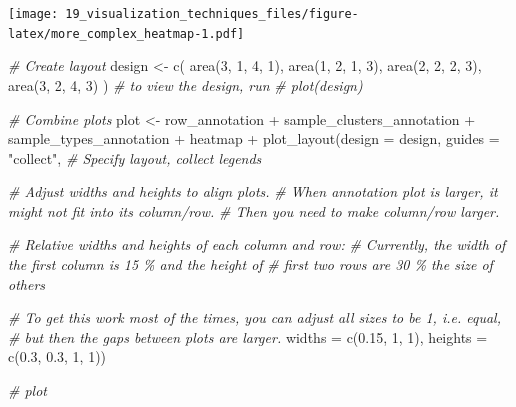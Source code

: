 \documentclass[
]{book}
\newenvironment{Shaded}{\begin{snugshade}}{\end{snugshade}}
\newcommand{\AttributeTok}[1]{\textcolor[rgb]{0.77,0.63,0.00}{#1}}
\newcommand{\CommentTok}[1]{\textcolor[rgb]{0.56,0.35,0.01}{\textit{#1}}}
\newcommand{\DecValTok}[1]{\textcolor[rgb]{0.00,0.00,0.81}{#1}}
\newcommand{\FloatTok}[1]{\textcolor[rgb]{0.00,0.00,0.81}{#1}}
\newcommand{\FunctionTok}[1]{\textcolor[rgb]{0.00,0.00,0.00}{#1}}
\newcommand{\NormalTok}[1]{#1}
\newcommand{\OtherTok}[1]{\textcolor[rgb]{0.56,0.35,0.01}{#1}}
\newcommand{\SpecialCharTok}[1]{\textcolor[rgb]{0.00,0.00,0.00}{#1}}
\newcommand{\StringTok}[1]{\textcolor[rgb]{0.31,0.60,0.02}{#1}}
\begin{document}
\texttt{[image: 19\_visualization\_techniques\_files/figure-latex/more\_complex\_heatmap-1.pdf]}

\begin{Shaded}
\begin{Highlighting}[]
\CommentTok{\# Create layout}
\NormalTok{design }\OtherTok{\textless{}{-}} \FunctionTok{c}\NormalTok{(}
  \FunctionTok{area}\NormalTok{(}\DecValTok{3}\NormalTok{, }\DecValTok{1}\NormalTok{, }\DecValTok{4}\NormalTok{, }\DecValTok{1}\NormalTok{),}
  \FunctionTok{area}\NormalTok{(}\DecValTok{1}\NormalTok{, }\DecValTok{2}\NormalTok{, }\DecValTok{1}\NormalTok{, }\DecValTok{3}\NormalTok{),}
  \FunctionTok{area}\NormalTok{(}\DecValTok{2}\NormalTok{, }\DecValTok{2}\NormalTok{, }\DecValTok{2}\NormalTok{, }\DecValTok{3}\NormalTok{),}
  \FunctionTok{area}\NormalTok{(}\DecValTok{3}\NormalTok{, }\DecValTok{2}\NormalTok{, }\DecValTok{4}\NormalTok{, }\DecValTok{3}\NormalTok{)}
\NormalTok{)}
\CommentTok{\# to view the design, run}
\CommentTok{\# plot(design)}

\CommentTok{\# Combine plots}
\NormalTok{plot }\OtherTok{\textless{}{-}}\NormalTok{ row\_annotation }\SpecialCharTok{+}\NormalTok{ sample\_clusters\_annotation }\SpecialCharTok{+}\NormalTok{ sample\_types\_annotation }\SpecialCharTok{+}\NormalTok{ heatmap  }\SpecialCharTok{+}
    \FunctionTok{plot\_layout}\NormalTok{(}\AttributeTok{design =}\NormalTok{ design, }\AttributeTok{guides =} \StringTok{"collect"}\NormalTok{, }\CommentTok{\# Specify layout, collect legends}
                
                \CommentTok{\# Adjust widths and heights to align plots.}
                \CommentTok{\# When annotation plot is larger, it might not fit into its column/row.}
                \CommentTok{\# Then you need to make column/row larger.}
                
                \CommentTok{\# Relative widths and heights of each column and row:}
                \CommentTok{\# Currently, the width of the first column is 15 \% and the height of}
                \CommentTok{\# first two rows are 30 \% the size of others}
                
                \CommentTok{\# To get this work most of the times, you can adjust all sizes to be 1, i.e. equal, }
                \CommentTok{\# but then the gaps between plots are larger.}
                \AttributeTok{widths =} \FunctionTok{c}\NormalTok{(}\FloatTok{0.15}\NormalTok{, }\DecValTok{1}\NormalTok{, }\DecValTok{1}\NormalTok{),}
                \AttributeTok{heights =} \FunctionTok{c}\NormalTok{(}\FloatTok{0.3}\NormalTok{, }\FloatTok{0.3}\NormalTok{, }\DecValTok{1}\NormalTok{, }\DecValTok{1}\NormalTok{))}

\CommentTok{\# plot}
\end{Highlighting}
\end{Shaded}
\end{document}
